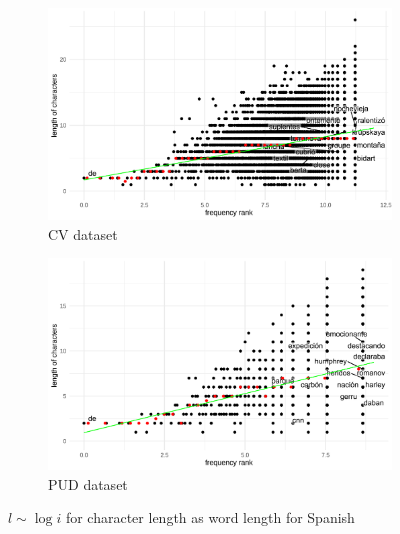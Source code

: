 \begin{figure}[H]
  \centering
  \begin{subfigure}[b]{0.48\textwidth}
    \centering
    \includegraphics[width=\textwidth]{plots/Spanish_logi_cl_CV.pdf}
    \caption{CV dataset}
  \end{subfigure}
  \hfill
  \begin{subfigure}[b]{0.48\textwidth}
    \centering
    \includegraphics[width=\textwidth]{plots/Spanish_logi_cl_PUD.pdf}
    \caption{PUD dataset}
  \end{subfigure}
  \caption{$l \sim \log i$ for character length as word length for Spanish}
\end{figure}
